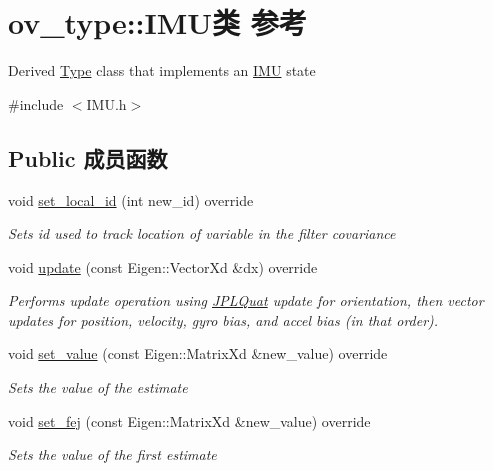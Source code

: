 \hypertarget{classov__type_1_1IMU}{}\section{ov\+\_\+type\+:\+:I\+M\+U类 参考}
\label{classov__type_1_1IMU}


Derived \hyperlink{classov__type_1_1Type}{Type} class that implements an \hyperlink{classov__type_1_1IMU}{I\+MU} state  




{\ttfamily \#include $<$I\+M\+U.\+h$>$}

\subsection*{Public 成员函数}
\begin{DoxyCompactItemize}
\item 
void \hyperlink{classov__type_1_1IMU_a9d4e915d474e8e13591a11a54ac7c969}{set\+\_\+local\+\_\+id} (int new\+\_\+id) override
\begin{DoxyCompactList}\small\item\em Sets id used to track location of variable in the filter covariance \end{DoxyCompactList}\item 
void \hyperlink{classov__type_1_1IMU_ac40233687ffc481f5d4d1ebaaf882577}{update} (const Eigen\+::\+Vector\+Xd \&dx) override
\begin{DoxyCompactList}\small\item\em Performs update operation using \hyperlink{classov__type_1_1JPLQuat}{J\+P\+L\+Quat} update for orientation, then vector updates for position, velocity, gyro bias, and accel bias (in that order). \end{DoxyCompactList}\item 
void \hyperlink{classov__type_1_1IMU_a53586b4f92ba0110c2b2241fa26862a1}{set\+\_\+value} (const Eigen\+::\+Matrix\+Xd \&new\+\_\+value) override
\begin{DoxyCompactList}\small\item\em Sets the value of the estimate \end{DoxyCompactList}\item 
void \hyperlink{classov__type_1_1IMU_aadf4a83a2371984898ca8c6a339617ce}{set\+\_\+fej} (const Eigen\+::\+Matrix\+Xd \&new\+\_\+value) override
\begin{DoxyCompactList}\small\item\em Sets the value of the first estimate \end{DoxyCompactList}\item 

\end{DoxyCompactItemize}
